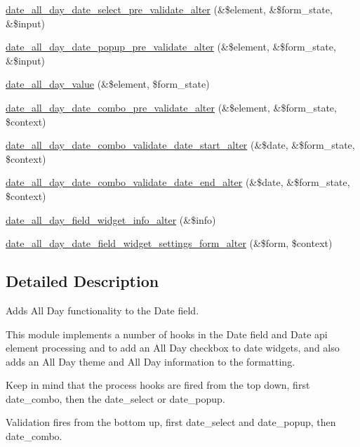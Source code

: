 \begin{DoxyCompactItemize}
\item 
\hyperlink{date__all__day_8module_ab13518df6a1115c872752e88b22efe3c}{date\_\-all\_\-day\_\-date\_\-select\_\-pre\_\-validate\_\-alter} (\&\$element, \&\$form\_\-state, \&\$input)
\item 
\hyperlink{date__all__day_8module_a4138a46a5760b72f5bc35574629b1aa8}{date\_\-all\_\-day\_\-date\_\-popup\_\-pre\_\-validate\_\-alter} (\&\$element, \&\$form\_\-state, \&\$input)
\item 
\hyperlink{date__all__day_8module_a1856ce458f79c00e45a3b662789279ac}{date\_\-all\_\-day\_\-value} (\&\$element, \$form\_\-state)
\item 
\hyperlink{date__all__day_8module_a2d4971b95fc7ced169a5884f7a743d25}{date\_\-all\_\-day\_\-date\_\-combo\_\-pre\_\-validate\_\-alter} (\&\$element, \&\$form\_\-state, \$context)
\item 
\hyperlink{date__all__day_8module_ac75e5076e22ad57fda35eb39d010d85a}{date\_\-all\_\-day\_\-date\_\-combo\_\-validate\_\-date\_\-start\_\-alter} (\&\$date, \&\$form\_\-state, \$context)
\item 
\hyperlink{date__all__day_8module_ad17a2337943546db27ba8cd7da71ce5b}{date\_\-all\_\-day\_\-date\_\-combo\_\-validate\_\-date\_\-end\_\-alter} (\&\$date, \&\$form\_\-state, \$context)
\item 
\hyperlink{date__all__day_8module_a405d14e66b39059a5b8bd5e0ac7674af}{date\_\-all\_\-day\_\-field\_\-widget\_\-info\_\-alter} (\&\$info)
\item 
\hyperlink{date__all__day_8module_af94f4e37599b25e52892abb3b3f10a5f}{date\_\-all\_\-day\_\-date\_\-field\_\-widget\_\-settings\_\-form\_\-alter} (\&\$form, \$context)
\end{DoxyCompactItemize}


\subsection{Detailed Description}
Adds All Day functionality to the Date field.

This module implements a number of hooks in the Date field and Date api element processing and to add an All Day checkbox to date widgets, and also adds an All Day theme and All Day information to the formatting.

Keep in mind that the process hooks are fired from the top down, first date\_\-combo, then the date\_\-select or date\_\-popup.

Validation fires from the bottom up, first date\_\-select and date\_\-popup, then date\_\-combo. 

